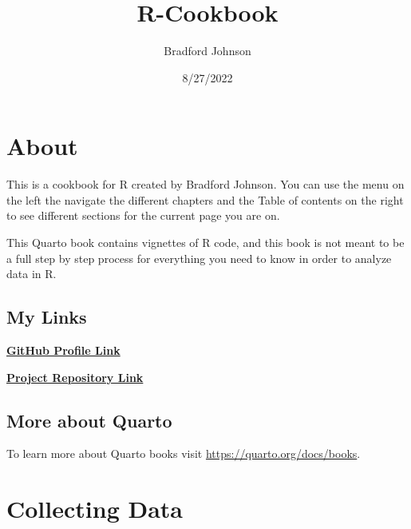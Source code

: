 \documentclass[
  letterpaper,
  DIV=11,
  numbers=noendperiod]{scrreprt}
\title{R-Cookbook}
\author{Bradford Johnson}
\date{8/27/2022}
\renewcommand*\contentsname{Table of contents}
\newcommand\contentsname{Table of contents}
\begin{document}
\maketitle
\ifdefined\Shaded\renewenvironment{Shaded}{\begin{tcolorbox}[frame hidden, breakable, interior hidden, sharp corners, boxrule=0pt, borderline west={3pt}{0pt}{shadecolor}, enhanced]}{\end{tcolorbox}}\fi

\renewcommand*\contentsname{Table of contents}
{
\hypersetup{linkcolor=}
\setcounter{tocdepth}{2}
\tableofcontents
}

\hypertarget{about}{%
\chapter*{About}\label{about}}

This is a cookbook for R created by Bradford Johnson. You can use the
menu on the left the navigate the different chapters and the Table of
contents on the right to see different sections for the current page you
are on.

This Quarto book contains vignettes of R code, and this book is not
meant to be a full step by step process for everything you need to know
in order to analyze data in R.

\hypertarget{my-links}{%
\section*{My Links}\label{my-links}}

\href{https://github.com/bradfordjohnson}{\textbf{GitHub Profile Link}}

\href{https://github.com/bradfordjohnson/r-cookbook}{\textbf{Project
Repository Link}}

\hypertarget{more-about-quarto}{%
\section*{More about Quarto}\label{more-about-quarto}}

To learn more about Quarto books visit
\url{https://quarto.org/docs/books}.


\hypertarget{collecting-data}{%
\chapter{Collecting Data}\label{collecting-data}}
\end{document}
